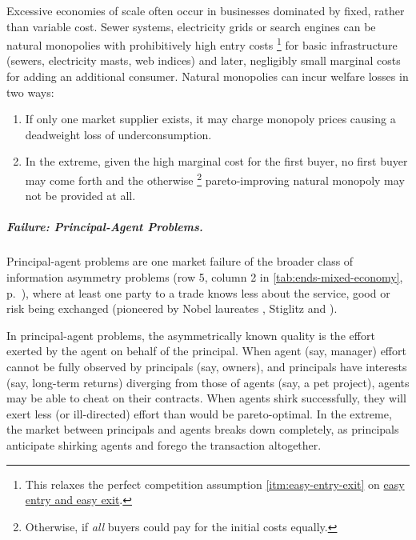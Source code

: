 Excessive economies of scale often occur in businesses dominated by fixed, rather than variable cost. 
Sewer systems, electricity grids or search engines can be natural monopolies with prohibitively high entry costs
\footnote{
	This relaxes the perfect competition assumption \ref{itm:easy-entry-exit} on \hyperref[itm:easy-entry-exit]{easy entry and easy exit}.} 
for basic infrastructure (sewers, electricity masts, web indices) and later, negligibly small marginal costs for adding an additional consumer. 
Natural monopolies can incur welfare losses in two ways: 
\begin{enumerate}
	\item If only one market supplier exists, it may charge monopoly prices causing a deadweight loss of underconsumption. 
	\item In the extreme, given the high marginal cost for the first buyer, no first buyer may come forth and the otherwise
	\footnote{
		Otherwise, if \emph{all} buyers could pay for the initial costs equally.
	} 
	pareto-improving natural monopoly may not be provided at all.
\end{enumerate} 

\subparagraph[Failure: Principal-Agent Problems]{Failure: Principal-Agent Problems.} \label{sec:principal-agent-problem} 
Principal-agent problems are one market failure of the broader class of information asymmetry problems (row 5, column 2 in \autoref{tab:ends-mixed-economy}, p.~\pageref{tab:ends-mixed-economy}), where at least one party to a trade knows less about the service, good or risk being exchanged (pioneered by Nobel laureates \citealt{Akerlof-1970-aa}, Stiglitz \citeyear{Stiglitz1976} and \citealt{Spence1974}).

In principal-agent problems, the asymmetrically known quality is the effort exerted by the agent on behalf of the principal. 
When agent (say, manager) effort cannot be fully observed by principals (say, owners), and principals have interests (say, long-term returns) diverging from those of agents (say, a pet project), agents may be able to cheat on their contracts. 
When agents shirk successfully, they will exert less (or ill-directed) effort than would be pareto-optimal. 
In the extreme, the market between principals and agents breaks down completely, as principals anticipate shirking agents and forego the transaction altogether. 

